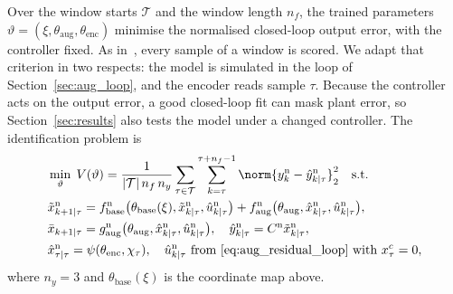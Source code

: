 Over the window starts $\mathcal T$ and the window length $n_f$, the trained
parameters $\vartheta=(\xi,\theta_{\mathrm{aug}},\theta_{\mathrm{enc}})$
minimise the normalised closed-loop output error, with the controller fixed.
As in~\cite[Eq.~(22)]{hoekstra2026lfr}, every sample of a window is scored.
We adapt that criterion in two respects: the model is simulated in the loop
of Section~\ref{sec:aug_loop}, and the encoder reads sample $\tau$.
Because the controller acts on the output error, a good closed-loop fit can
mask plant error, so Section~\ref{sec:results} also tests the model under a
changed controller.
The identification problem is
\begin{equation}
\begin{aligned}
 &\min_{\vartheta}\;V(\vartheta)=\frac{1}{|\mathcal T|\,n_f\,n_y}
 \sum_{\tau\in\mathcal T}\sum_{k=\tau}^{\tau+n_f-1}
 \norm{y^{\mathrm n}_{k}-\hat y^{\mathrm n}_{k|\tau}}_2^2\quad\text{s.t.}\\
 &\tilde x^{\mathrm n}_{k+1|\tau}
  =f^{\mathrm n}_{\mathrm{base}}\bigl(\theta_{\mathrm{base}}(\xi),
   \tilde x^{\mathrm n}_{k|\tau},\hat u^{\mathrm n}_{k|\tau}\bigr)
  +f^{\mathrm n}_{\mathrm{aug}}\bigl(\theta_{\mathrm{aug}},
   \hat x^{\mathrm n}_{k|\tau},\hat u^{\mathrm n}_{k|\tau}\bigr),\\
 &\bar x_{k+1|\tau}=g^{\mathrm n}_{\mathrm{aug}}\bigl(\theta_{\mathrm{aug}},
   \hat x^{\mathrm n}_{k|\tau},\hat u^{\mathrm n}_{k|\tau}\bigr),\quad
  \hat y^{\mathrm n}_{k|\tau}=C^{\mathrm n}\tilde x^{\mathrm n}_{k|\tau},\\
 &\hat x^{\mathrm n}_{\tau|\tau}=\psi(\theta_{\mathrm{enc}},\chi_\tau),\quad
  \hat u^{\mathrm n}_{k|\tau}\text{ from \eqref{eq:aug_residual_loop} with }x^{c}_\tau=0,
\end{aligned}
\label{eq:aug_loss}
\end{equation}
where $n_y=3$ and $\theta_{\mathrm{base}}(\xi)$ is the coordinate map above.

